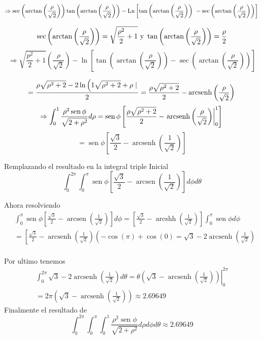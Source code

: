 $$
\Rightarrow \sec \left(\arctan \left(\frac{\rho}{\sqrt{2}}\right)\right) \tan \left(\arctan \left(\frac{\rho}{\sqrt{2}}\right)\right)-\operatorname{Ln}\left[\tan \left(\arctan \left(\frac{\rho}{\sqrt{2}}\right)\right)\ -\sec \left(\arctan \left(\frac{\rho}{\sqrt{2}}\right)\right)\right]\\
$$

$$
\sec \left(\arctan \left(\frac{\rho}{\sqrt{2}}\right)\right)=\sqrt{\frac{\rho^2}{2}+1}\\
\text{ y }\\
\tan \left(\arctan \left(\frac{\rho}{\sqrt{2}}\right)\right) = \frac{\rho}{2} \\
$$
$$
\Rightarrow \sqrt{\frac{p^2}{2}+1} \left(\frac{\rho}{\sqrt{2}}\right)-\ln \left[\tan \left(\arctan \left(\frac{\rho}{\sqrt{2}}\right)\right) -\sec \left(\arctan \left(\frac{\rho}{\sqrt{2}}\right)\right)\right]
$$

$$
=\frac{\rho \sqrt{\rho^2+2}-2 \ln \left(1 \sqrt{\rho^2+2}+\rho \mid\right.}{2} \\
=  \frac{\rho \sqrt{\rho^2+2}}{2}-\operatorname{arcsenh}\left(\frac{\rho}{\sqrt{2}}\right) \\
$$
$$
\Rightarrow \int_0^1 \frac{\rho^2 \operatorname{sen} \phi}{\sqrt{2+\rho^2}} d \rho=\operatorname{sen} \phi\left[\frac{\rho \sqrt{\rho^2+2}}{2}-\left.\operatorname{arcsenh}\left(\frac{\rho}{\sqrt{2}}\right)\right|_0 ^1\right] \\
$$
$$
=  \operatorname{sen} \phi\left[\frac{\sqrt{3}}{2}-\operatorname{arcsenh}\left(\frac{1}{\sqrt{2}}\right)\right]
$$

Remplazando el resultado en la integral triple Inicial
$$
\int_0^{2 \pi} \int_0^\pi \operatorname{sen} \phi\left[\frac{\sqrt{3}}{2}-\operatorname{arcsen}\left(\frac{1}{\sqrt{2}}\right)\right] d \phi d \theta
$$

Ahora resolviendo
$$
\begin{aligned}
& \int_0^\pi \operatorname{sen} \phi\left[\frac{\sqrt{3}}{2}-\operatorname{arcsen}\left(\frac{1}{\sqrt{2}}\right)\right] d \phi=\left[\frac{\sqrt{3}}{2}-\operatorname{arcshh}\left(\frac{1}{\sqrt{2}}\right)\right] \int_0^\pi \operatorname{sen} \phi d \phi \\
&= {\left[\frac{\sqrt{3}}{2}-\operatorname{arcsenh}\left(\frac{1}{\sqrt{2}}\right)\left(-\cos (\pi)+\cos (0)=\sqrt{3}-2 \operatorname{arcsenh}\left(\frac{1}{\sqrt{2}}\right)\right.\right.} \\
\end{aligned}
$$

Por ultimo tenemos
$$
\begin{array}{l}
\int_0^{2\pi} \sqrt{3}-2 \operatorname{arcsenh}\left(\frac{1}{\sqrt{2}}\right) d \theta=\left.\theta\left(\sqrt{3}-\operatorname{arcsenh}\left(\frac{1}{\sqrt{2}}\right)\right)\right|_0 ^{2 \pi} \\
=2 \pi\left(\sqrt{3}-\operatorname{arcsenh}\left(\frac{1}{\sqrt{2}}\right)\right) \approx 2.69649
\end{array}
$$
Finalmente el resultado de
$$
\int_0^{2 \pi} \int_0^\pi \int_0^1 \frac{\rho^2 \operatorname{sen} \phi}{\sqrt{2+\rho^2}} d \rho d \phi d \theta  \approx 2.69649
$$
